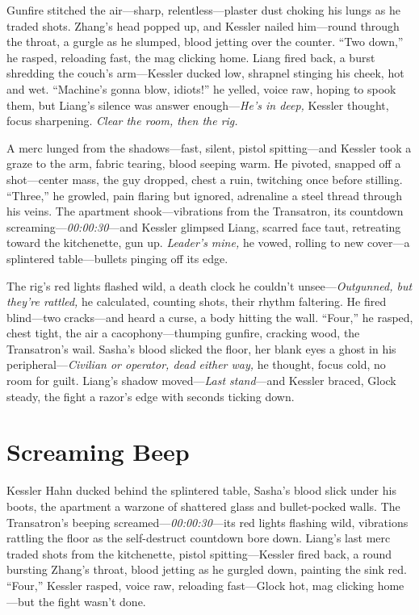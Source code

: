 \documentclass[12pt]{book}
\begin{document}
Gunfire stitched the air—sharp, relentless—plaster dust choking his lungs as he traded shots. Zhang’s head popped up, and Kessler nailed him—round through the throat, a gurgle as he slumped, blood jetting over the counter. “Two down,” he rasped, reloading fast, the mag clicking home. Liang fired back, a burst shredding the couch’s arm—Kessler ducked low, shrapnel stinging his cheek, hot and wet. “Machine’s gonna blow, idiots!” he yelled, voice raw, hoping to spook them, but Liang’s silence was answer enough—\textit{He’s in deep,} Kessler thought, focus sharpening. \textit{Clear the room, then the rig.}

A merc lunged from the shadows—fast, silent, pistol spitting—and Kessler took a graze to the arm, fabric tearing, blood seeping warm. He pivoted, snapped off a shot—center mass, the guy dropped, chest a ruin, twitching once before stilling. “Three,” he growled, pain flaring but ignored, adrenaline a steel thread through his veins. The apartment shook—vibrations from the Transatron, its countdown screaming—\textit{00:00:30}—and Kessler glimpsed Liang, scarred face taut, retreating toward the kitchenette, gun up. \textit{Leader’s mine,} he vowed, rolling to new cover—a splintered table—bullets pinging off its edge.

The rig’s red lights flashed wild, a death clock he couldn’t unsee—\textit{Outgunned, but they’re rattled,} he calculated, counting shots, their rhythm faltering. He fired blind—two cracks—and heard a curse, a body hitting the wall. “Four,” he rasped, chest tight, the air a cacophony—thumping gunfire, cracking wood, the Transatron’s wail. Sasha’s blood slicked the floor, her blank eyes a ghost in his peripheral—\textit{Civilian or operator, dead either way,} he thought, focus cold, no room for guilt. Liang’s shadow moved—\textit{Last stand}—and Kessler braced, Glock steady, the fight a razor’s edge with seconds ticking down.

\section{Screaming Beep}

Kessler Hahn ducked behind the splintered table, Sasha’s blood slick under his boots, the apartment a warzone of shattered glass and bullet-pocked walls. The Transatron’s beeping screamed—\textit{00:00:30}—its red lights flashing wild, vibrations rattling the floor as the self-destruct countdown bore down. Liang’s last merc traded shots from the kitchenette, pistol spitting—Kessler fired back, a round bursting Zhang’s throat, blood jetting as he gurgled down, painting the sink red. “Four,” Kessler rasped, voice raw, reloading fast—Glock hot, mag clicking home—but the fight wasn’t done.
\end{document}
